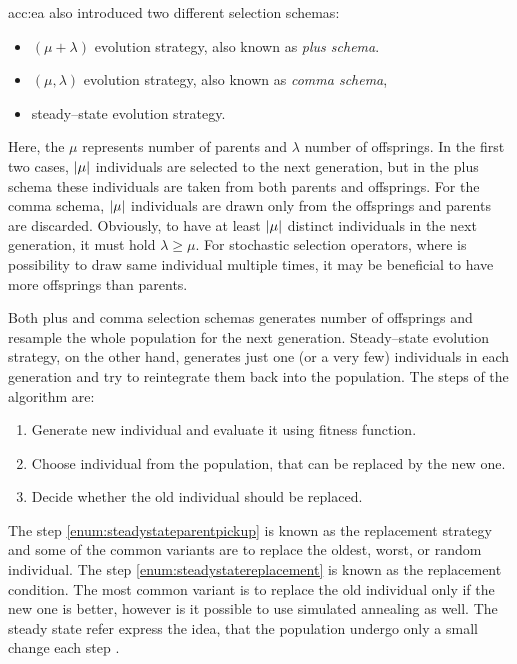 \acrshort{acc:ea} also introduced two different selection schemas:
\begin{itemize}
    \item $\left(\mu+\lambda\right)$ evolution strategy, also known as \emph{plus schema}.
    \item  $\left(\mu,\lambda\right)$ evolution strategy, also known as \emph{comma schema},
    \item steady--state evolution strategy.
\end{itemize}
Here, the $\mu$ represents number of parents and $\lambda$ number of offsprings. In the first two cases, $\left|{\mu}\right|$ individuals are selected to the next generation, but in the plus schema these individuals are taken from both parents and offsprings. For the comma schema, $\left|{\mu}\right|$ individuals are drawn only from the offsprings and parents are discarded. Obviously, to have at least $\left|{\mu}\right|$ distinct individuals in the next generation, it must hold $\lambda\geq\mu$. For stochastic selection operators, where is possibility to draw same individual multiple times, it may be beneficial to have more offsprings than parents.

Both plus and comma selection schemas generates number of offsprings and resample the whole population for the next generation. Steady--state evolution strategy, on the other hand, generates just one (or a very few) individuals in each generation and try to reintegrate them back into the population. The steps of the algorithm are:
\begin{enumerate}
    \item Generate new individual and evaluate it using fitness function.
    \item\label{enum:steadystateparentpickup} Choose individual from the population, that can be replaced by the new one.
    \item\label{enum:steadystatereplacement} Decide whether the old individual should be replaced.
\end{enumerate}
The step \ref{enum:steadystateparentpickup} is known as the replacement strategy and some of the common variants are to replace the oldest, worst, or random individual. The step \ref{enum:steadystatereplacement} is known as the replacement condition. The most common variant is to replace the old individual only if the new one is better, however is it possible to use simulated annealing as well.
The steady state refer express the idea, that the population undergo only a small change each step \citep{SteadyStateEvolutionStrategy}.

